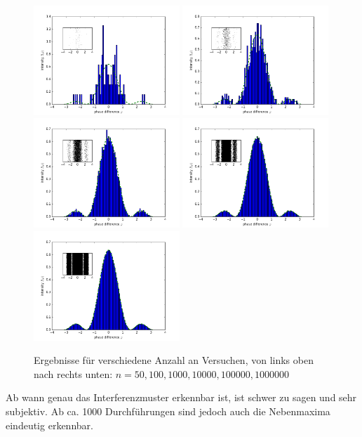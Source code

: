 \begin{enumerate}[(a)]
\begin{figure}[htbp]
\includegraphics[width=0.49\textwidth]{100.png}
\includegraphics[width=0.49\textwidth]{1000.png}
\includegraphics[width=0.49\textwidth]{10000.png}
\includegraphics[width=0.49\textwidth]{100000.png}
\includegraphics[width=0.49\textwidth]{1000000.png}
\caption{Ergebnisse für verschiedene Anzahl an Versuchen, von links oben nach rechts unten: $n=50,100,1000,10000,100000,1000000$}
\label{fig:montecarlo}
\end{figure}
Ab wann genau das Interferenzmuster erkennbar ist, ist schwer zu sagen und sehr subjektiv. Ab ca. 1000 Durchführungen sind jedoch auch die Nebenmaxima eindeutig erkennbar.
\end{enumerate}
